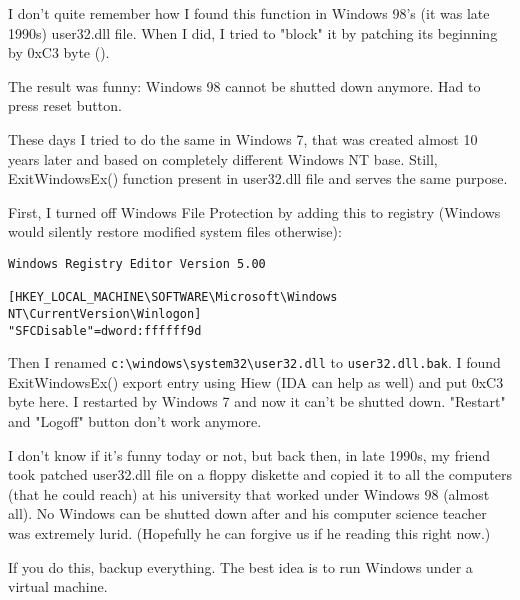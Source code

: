 
I don't quite remember how I found this function in Windows 98's (it was late 1990s) user32.dll file.
When I did, I tried to "block" it by patching its beginning by 0xC3 byte ().

The result was funny: Windows 98 cannot be shutted down anymore.
Had to press reset button.

These days I tried to do the same in Windows 7, that was created almost 10 years later and based on completely different Windows NT
base.
Still, ExitWindowsEx() function present in user32.dll file and serves the same purpose.

First, I turned off Windows File Protection by adding this to registry (Windows would silently restore modified system files otherwise):

\begin{lstlisting}
Windows Registry Editor Version 5.00

[HKEY_LOCAL_MACHINE\SOFTWARE\Microsoft\Windows NT\CurrentVersion\Winlogon]
"SFCDisable"=dword:ffffff9d
\end{lstlisting}

Then I renamed \verb|c:\windows\system32\user32.dll| to \verb|user32.dll.bak|.
I found ExitWindowsEx() export entry using Hiew (IDA can help as well) and put 0xC3 byte here.
I restarted by Windows 7 and now it can't be shutted down.
"Restart" and "Logoff" button don't work anymore.

I don't know if it's funny today or not, but back then, in late 1990s, my friend took patched user32.dll file
on a floppy diskette and copied it to all the computers (that he could reach)
at his university that worked under Windows 98 (almost all).
No Windows can be shutted down after and his computer science teacher was extremely lurid.
(Hopefully he can forgive us if he reading this right now.)

If you do this, backup everything.
The best idea is to run Windows under a virtual machine.

